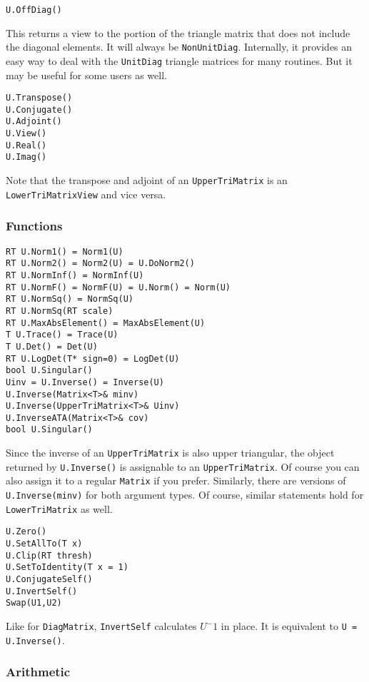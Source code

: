 \documentclass[twoside,letterpaper,11pt]{article}
\renewcommand{\tt}[1]{{\texttt {#1}}}
\begin{document}
\begin{verbatim}
U.OffDiag()
\end{verbatim}
This returns a view to the portion of the triangle matrix that does not include
the diagonal elements.  It will always be \tt{NonUnitDiag}.
Internally, it provides an easy way to deal with the \tt{UnitDiag} triangle matrices
for many routines.  But it may be useful for some users as well.

\begin{verbatim}
U.Transpose()
U.Conjugate()
U.Adjoint()
U.View()
U.Real()
U.Imag()
\end{verbatim}
Note that the transpose and adjoint of an \tt{UpperTriMatrix} is an
\tt{LowerTriMatrixView} and vice versa.

\subsubsection{Functions}

\begin{verbatim}
RT U.Norm1() = Norm1(U)
RT U.Norm2() = Norm2(U) = U.DoNorm2()
RT U.NormInf() = NormInf(U)
RT U.NormF() = NormF(U) = U.Norm() = Norm(U)
RT U.NormSq() = NormSq(U)
RT U.NormSq(RT scale)
RT U.MaxAbsElement() = MaxAbsElement(U)
T U.Trace() = Trace(U)
T U.Det() = Det(U)
RT U.LogDet(T* sign=0) = LogDet(U)
bool U.Singular()
Uinv = U.Inverse() = Inverse(U)
U.Inverse(Matrix<T>& minv)
U.Inverse(UpperTriMatrix<T>& Uinv)
U.InverseATA(Matrix<T>& cov)
bool U.Singular()
\end{verbatim}
Since the inverse of an \tt{UpperTriMatrix} is also upper triangular,
the object returned by \tt{U.Inverse()} is 
assignable to an \tt{UpperTriMatrix}.  Of course you can also assign it
to a regular \tt{Matrix} if you prefer.  Similarly, there are versions
of \tt{U.Inverse(minv)} for both argument types.  Of course, similar statements
hold for \tt{LowerTriMatrix} as well.

\begin{verbatim}
U.Zero()
U.SetAllTo(T x)
U.Clip(RT thresh)
U.SetToIdentity(T x = 1)
U.ConjugateSelf()
U.InvertSelf()
Swap(U1,U2)
\end{verbatim}
Like for \tt{DiagMatrix}, \tt{InvertSelf} calculates $U^-1$ in place.  
It is equivalent to \tt{U = U.Inverse()}.

\subsubsection{Arithmetic}
\end{document}
